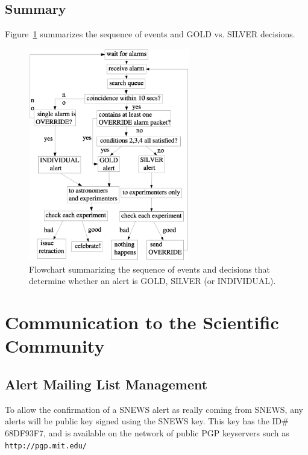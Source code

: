 \documentclass{article}
\begin{document}

\subsection{Summary}

Figure~\ref{fig:flowchart} summarizes the sequence of events 
and GOLD vs. SILVER decisions.

\begin{figure}[htbp]
\begin{center}
\includegraphics[width=7cm, bb= 40 120 539 820]{flowchart3.0.eps}
\vspace{0.2in}
\caption{\label{fig:flowchart} 
Flowchart summarizing the 
sequence of events and decisions that determine whether an
alert is GOLD, SILVER (or INDIVIDUAL).}
\end{center}
\end{figure}



\section{Communication to the Scientific Community}

\subsection{Alert Mailing List Management}

To allow the confirmation of a SNEWS alert as really coming from SNEWS,
any alerts will be public key signed using the SNEWS key.  This key has
the ID\# 68DF93F7, and is available on the network of public PGP
keyservers such as \texttt{http://pgp.mit.edu/}
\end{document}
